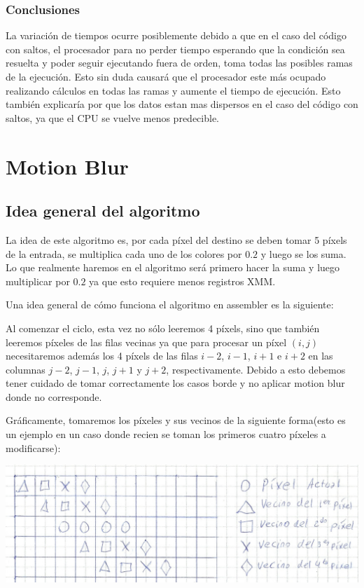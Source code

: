 \documentclass[a4paper]{article}
\begin{document}
\subsubsection{Conclusiones}

La variación de tiempos ocurre posiblemente debido a que en el caso del código con saltos, el procesador para no perder tiempo esperando que la condición sea resuelta y poder seguir ejecutando fuera de orden, toma todas las posibles ramas de la ejecución. Esto sin duda causará que el procesador este más ocupado realizando cálculos en todas las ramas y aumente el tiempo de ejecución. Esto también explicaría por que los datos estan mas dispersos en el caso del código con saltos, ya que el CPU se vuelve menos predecible.

\newpage
\section{Motion Blur}
\subsection{Idea general del algoritmo}
La idea de este algoritmo es, por cada píxel del destino se deben tomar 5 píxels de la entrada, se multiplica cada uno de los colores por $0.2$ y luego se los suma. Lo que realmente haremos en el algoritmo será primero hacer la suma y luego multiplicar por $0.2$ ya que esto requiere menos registros XMM.

Una idea general de cómo funciona el algoritmo en assembler es la siguiente:

Al comenzar el ciclo, esta vez no sólo leeremos 4 píxels, sino que también leeremos píxeles de las filas vecinas ya que para procesar un píxel $(i,j)$ necesitaremos además los 4 píxels de las filas $i-2$, $i-1$, $i+1$ e $i+2$ en las columnas $j-2$, $j-1$, $j$, $j+1$ y $j+2$, respectivamente. Debido a esto debemos tener cuidado de tomar correctamente los casos borde y no aplicar motion blur donde no corresponde.

Gráficamente, tomaremos los píxeles y sus vecinos de la siguiente forma(esto es un ejemplo en un caso donde recien se toman los primeros cuatro píxeles a modificarse):

\begin{center}
\includegraphics[scale=0.66]{Dibujos/MB1.jpg}
\end{center}
\end{document}
